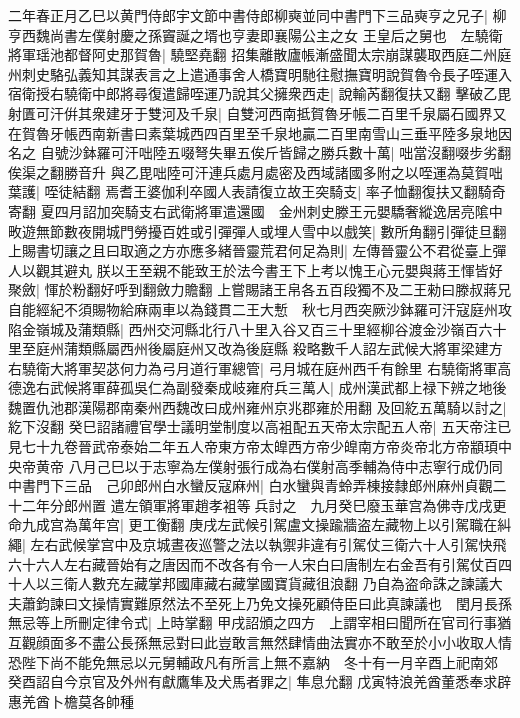 二年春正月乙巳以黄門侍郎宇文節中書侍郎柳奭並同中書門下三品奭亨之兄子|{
	柳亨西魏尚書左僕射慶之孫竇誕之壻也亨妻即襄陽公主之女}
王皇后之舅也　左驍衛將軍瑶池都督阿史那賀魯|{
	驍堅堯翻}
招集離散廬帳漸盛聞太宗崩謀襲取西庭二州庭州刺史駱弘義知其謀表言之上遣通事舍人橋寶明馳往慰撫寶明說賀魯令長子咥運入宿衛授右驍衛中郎將尋復遣歸咥運乃說其父擁衆西走|{
	說輸芮翻復扶又翻}
擊破乙毘射匱可汗倂其衆建牙于雙河及千泉|{
	自雙河西南抵賀魯牙帳二百里千泉屬石國界又在賀魯牙帳西南新書曰素葉城西四百里至千泉地贏二百里南雪山三垂平陸多泉地因名之}
自號沙鉢羅可汗咄陸五啜弩失畢五俟斤皆歸之勝兵數十萬|{
	咄當沒翻啜步劣翻俟渠之翻勝音升}
與乙毘咄陸可汗連兵處月處密及西域諸國多附之以咥運為莫賀咄葉護|{
	咥徒結翻}
焉耆王婆伽利卒國人表請復立故王突騎支|{
	率子恤翻復扶又翻騎奇寄翻}
夏四月詔加突騎支右武衛將軍遣還國　金州刺史滕王元嬰驕奢縱逸居亮隂中畋遊無節數夜開城門勞擾百姓或引彈彈人或埋人雪中以戲笑|{
	數所角翻引彈徒旦翻}
上賜書切讓之且曰取適之方亦應多緒晉靈荒君何足為則|{
	左傳晉靈公不君從臺上彈人以觀其避丸}
朕以王至親不能致王於法今書王下上考以愧王心元嬰與蔣王惲皆好聚斂|{
	惲於粉翻好呼到翻斂力贍翻}
上嘗賜諸王帛各五百段獨不及二王勑曰滕叔蔣兄自能經紀不須賜物給麻兩車以為錢貫二王大慙　秋七月西突厥沙鉢羅可汗寇庭州攻陷金嶺城及蒲類縣|{
	西州交河縣北行八十里入谷又百三十里經柳谷渡金沙嶺百六十里至庭州蒲類縣屬西州後屬庭州又改為後庭縣}
殺略數千人詔左武候大將軍梁建方右驍衛大將軍契苾何力為弓月道行軍總管|{
	弓月城在庭州西千有餘里}
右驍衛將軍高德逸右武候將軍薛孤吳仁為副發秦成岐雍府兵三萬人|{
	成州漢武都上禄下辨之地後魏置仇池郡漢陽郡南秦州西魏改曰成州雍州京兆郡雍於用翻}
及回紇五萬騎以討之|{
	紇下沒翻}
癸巳詔諸禮官學士議明堂制度以高袓配五天帝太宗配五人帝|{
	五天帝注已見七十九卷晉武帝泰始二年五人帝東方帝太皥西方帝少皥南方帝炎帝北方帝顓頊中央帝黄帝}
八月己巳以于志寧為左僕射張行成為右僕射高季輔為侍中志寧行成仍同中書門下三品　己卯郎州白水蠻反寇麻州|{
	白水蠻與青蛉弄棟接隸郎州麻州貞觀二十二年分郎州置}
遣左領軍將軍趙孝袓等兵討之　九月癸巳廢玉華宫為佛寺戊戌更命九成宫為萬年宫|{
	更工衡翻}
庚戌左武候引駕盧文操踰牆盗左藏物上以引駕職在糾繩|{
	左右武候掌宫中及京城晝夜巡警之法以執禦非違有引駕仗三衛六十人引駕快飛六十六人左右藏晉始有之唐因而不改各有令一人宋白曰唐制左右金吾有引駕仗百四十人以三衛人數充左藏掌邦國庫藏右藏掌國寶貨藏徂浪翻}
乃自為盗命誅之諫議大夫蕭鈞諫曰文操情實難原然法不至死上乃免文操死顧侍臣曰此真諫議也　閏月長孫無忌等上所刪定律令式|{
	上時掌翻}
甲戌詔頒之四方　上謂宰相曰聞所在官司行事猶互觀顔面多不盡公長孫無忌對曰此豈敢言無然肆情曲法實亦不敢至於小小收取人情恐陛下尚不能免無忌以元舅輔政凡有所言上無不嘉納　冬十有一月辛酉上祀南郊　癸酉詔自今京官及外州有獻鷹隼及犬馬者罪之|{
	隼息允翻}
戊寅特浪羌酋董悉奉求辟惠羌酋卜檐莫各帥種

